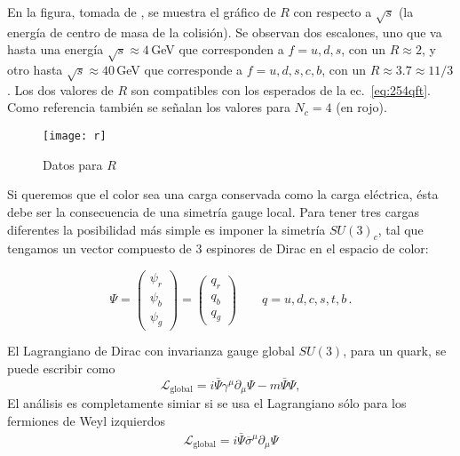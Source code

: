 En la figura, tomada de \cite{a}, se muestra el gráfico de $R$ con respecto a $\sqrt{s}$ (la energía de centro de masa de la colisión). Se observan dos escalones, uno que va hasta una energía $\sqrt{s}\approx4\,$GeV que corresponden a $f=u,d,s$, con un $R\approx2$,  y otro hasta $\sqrt{s}\approx40\,$GeV que corresponde a $f=u,d,s,c,b$, con un $R\approx3.7\approx11/3$. Los dos valores de $R$ son compatibles con los esperados de la ec.~\eqref{eq:254qft}. Como referencia también se señalan los valores para $N_c=4$ (en rojo). 
\begin{frame}
\begin{figure}
  \centering
  \texttt{[image: r]}
  \caption{Datos para $R$}
  \label{fig:r}
\end{figure}
\end{frame}



Si queremos que el color sea una carga conservada como la carga eléctrica, ésta debe ser la consecuencia de una simetría gauge local. Para tener tres cargas diferentes la posibilidad más simple es imponer la simetría $SU(3)_c$, tal que tengamos un vector compuesto de 3 espinores de Dirac en el espacio de color:

\begin{frame}  
\begin{equation}
  \Psi=
  \begin{pmatrix}
    \psi_r\\
    \psi_b\\
    \psi_g
  \end{pmatrix}
  =
  \begin{pmatrix}
    q_r\\
    q_b\\
    q_g
  \end{pmatrix}\qquad q=u,d,c,s,t,b\,.
\end{equation}
\end{frame}
El Lagrangiano de Dirac con invarianza gauge global $SU(3)$, para un quark, se puede escribir como
\begin{equation}
  \label{eq:128qft}
  \mathcal{L}_{\text{global}}=i\bar{\Psi}\gamma^\mu\partial_\mu\Psi-m\bar{\Psi}\Psi,
\end{equation}
El análisis es completamente simiar si se usa el Lagrangiano sólo para los fermiones de Weyl izquierdos
\begin{align}
    \mathcal{L}_{\text{global}}=i\bar{\Psi}\overline{\sigma}^\mu\partial_\mu\Psi
\end{align}

